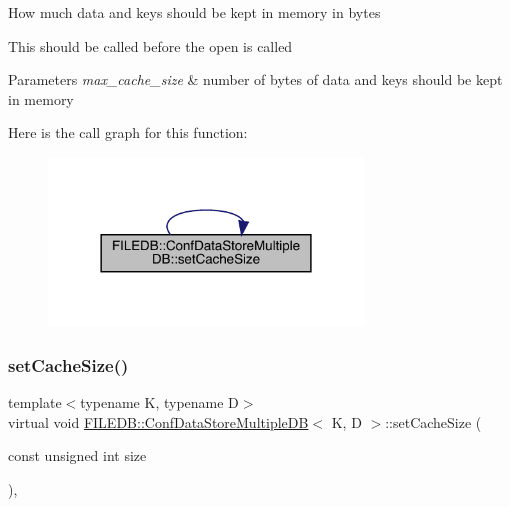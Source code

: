How much data and keys should be kept in memory in bytes

This should be called before the open is called 
\begin{DoxyParams}{Parameters}
{\em max\+\_\+cache\+\_\+size} & number of bytes of data and keys should be kept in memory \\
\hline
\end{DoxyParams}
Here is the call graph for this function\+:
\nopagebreak
\begin{figure}[H]
\begin{center}
\leavevmode
\includegraphics[width=237pt]{d3/dc0/classFILEDB_1_1ConfDataStoreMultipleDB_a37115269cf1f8f04c49ab888b040fa13_cgraph}
\end{center}
\end{figure}
\mbox{\label{classFILEDB_1_1ConfDataStoreMultipleDB_a37115269cf1f8f04c49ab888b040fa13}} 
\subsubsection{\texorpdfstring{setCacheSize()}{setCacheSize()}\hspace{0.1cm}{\footnotesize\ttfamily [2/3]}}
{\footnotesize\ttfamily template$<$typename K, typename D$>$ \\
virtual void \mbox{\hyperlink{classFILEDB_1_1ConfDataStoreMultipleDB}{F\+I\+L\+E\+D\+B\+::\+Conf\+Data\+Store\+Multiple\+DB}}$<$ K, D $>$\+::set\+Cache\+Size (\begin{DoxyParamCaption}\item[{const unsigned int}]{size }\end{DoxyParamCaption})\hspace{0.3cm}{\ttfamily [inline]}, {\ttfamily [virtual]}}

